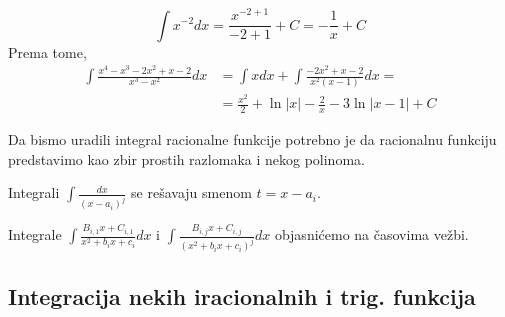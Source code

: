 \documentclass[a4paper,12pt,twoside]{report}
\numberwithin{algorithm}{section}
\begin{document}
\[
    \int x^{-2} dx = \frac{x^{-2+1}}{-2+1} + C = -\frac{1}{x} + C
\]
Prema tome,
\begin{align*}
    \int \frac{x^4 - x^3 - 2x^2 + x - 2}{x^3 - x^2} dx &= \int x dx + \int \frac{-2x^2 + x - 2}{x^2(x-1)} dx = \\
    &= \frac{x^2}{2} + \ln|x| - \frac{2}{x} - 3\ln|x-1| + C
\end{align*}

\vspace{0.5cm}

Da bismo uradili integral racionalne funkcije potrebno je da racionalnu funkciju predstavimo kao zbir prostih razlomaka i nekog polinoma.

Integrali \(\displaystyle \int \frac{dx}{(x-a_i)^j}\) se rešavaju smenom \(t = x-a_i\).

Integrale \(\displaystyle \int \frac{B_{i,1} x + C_{i,1}}{x^2+b_i x+c_i} dx\) i \(\displaystyle \int \frac{B_{i,j} x + C_{i,j}}{(x^2+b_i x+c_i)^j} dx\) objasnićemo na časovima vežbi.

\subsection{Integracija nekih iracionalnih i trig. funkcija}
\end{document}
